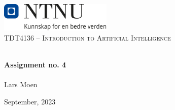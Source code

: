 \begin{titlepage}
\vbox{ }
\vbox{ }
\begin{center}
\includegraphics[width=0.40\textwidth]{Images/NTNU_logo.png}\\[1cm]
\textsc{\Large TDT4136 – Introduction to Artificial Intelligence}\\[0.5cm]
\vbox{ }

\HRule \\[0.4cm]
{ \huge \bfseries Assignment no. 4}\\[0.4cm]
\HRule \\[1.5cm]

\large
Lars Moen
\vfill

{\large September, 2023}
\end{center}
\end{titlepage}